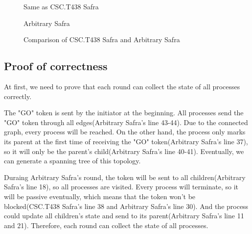 \documentclass{article}
\begin{document}
\begin{figure}[htb]
{{\begin{minipage}{0.58\hsize}
\begin{algorithm}[H]
          \textcolor{red}{
          }

          \fNewLine

           {
            Same as CSC.T438 Safra
          }

          \fNewLine


          \caption{Arbitrary Safra}
        \end{algorithm}
      \end{minipage}
    }}
  \caption{Comparison of CSC.T438 Safra and Arbitrary Safra}
\end{figure}

\subsection{Proof of correctness}
At first, we need to prove that each round can collect the state of all processes correctly.

The "GO" token is sent by the initiator at the beginning. All processes send the "GO" token through all edges(Arbitrary Safra's line 43-44). Due to the connected graph, every process will be reached.
On the other hand, the process only marks its parent at the first time of receiving the "GO" token(Arbitrary Safra's line 37), so it will only be the parent's child(Arbitrary Safra's line 40-41).
Eventually, we can generate a spanning tree of this topology.

Duraing Arbitrary Safra's round, the token will be sent to all children(Arbitrary Safra's line 18), so all processes are visited. Every process will terminate, so it will be passive eventually, which means that the token won't be blocked(CSC.T438 Safra's line 38 and Arbitrary Safra's line 30). And the process could update all children's state and send to its parent(Arbitrary Safra's line 11 and 21). Therefore, each round can collect the state of all processes.
\end{document}
